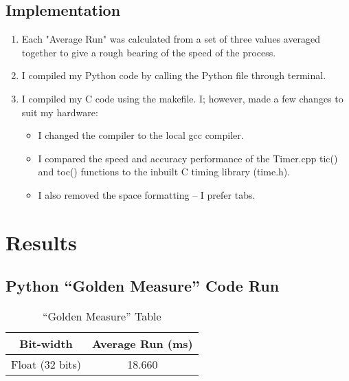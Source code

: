 \documentclass[journal]{IEEEtran}
\begin{document}
\subsection{Implementation}
\begin{enumerate}
  \item Each "Average Run" was calculated from a set of three values averaged together to give a rough bearing of the speed of the process.
  \item I compiled my Python code by calling the Python file through terminal.
  \item I compiled my C code using the makefile. I; however, made a few changes to suit my hardware:
\begin{itemize}
  \item I changed the compiler to the local gcc compiler.
  \item I compared the speed and accuracy performance of the Timer.cpp tic() and toc() functions to the inbuilt C timing library (time.h).
  \item I also removed the space formatting – I prefer tabs.
\end{itemize}
\end{enumerate}

\section{Results}

\subsection{Python “Golden Measure” Code Run}
\begin {table}[h!]
\begin{center}
\label{table:1} %
\caption{“Golden Measure” Table}
\begin{tabular}{ |c|c|}
\hline
Bit-width       & Average Run (ms) \\\hline
Float (32 bits) & 18.660     \\\hline
\end{tabular}
\end{center}
\end{table}
\end{document}
